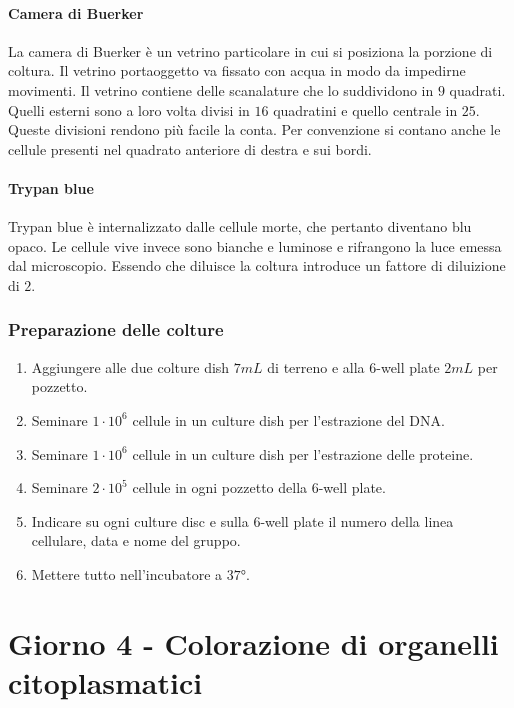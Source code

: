 			\paragraph{Camera di Buerker}
			La camera di Buerker \`e un vetrino particolare in cui si posiziona la porzione di coltura. 
			Il vetrino portaoggetto va fissato con acqua in modo da impedirne movimenti.
			Il vetrino contiene delle scanalature che lo suddividono in $9$ quadrati.
			Quelli esterni sono a loro volta divisi in $16$ quadratini e quello centrale in $25$.
			Queste divisioni rendono pi\`u facile la conta.
			Per convenzione si contano anche le cellule presenti nel quadrato anteriore di destra e sui bordi.

			\paragraph{Trypan blue}
			Trypan blue \`e internalizzato dalle cellule morte, che pertanto diventano blu opaco. 
			Le cellule vive invece sono bianche e luminose e rifrangono la luce emessa dal microscopio.
			Essendo che diluisce la coltura introduce un fattore di diluizione di $2$.
		
		\subsubsection{Preparazione delle colture}
		\begin{enumerate}
			\item Aggiungere alle due colture dish $7\si{mL}$ di terreno e alla $6$-well plate $2\si{mL}$ per pozzetto.
			\item Seminare $1\cdot 10^6$ cellule in un culture dish per l'estrazione del DNA.
			\item Seminare $1\cdot 10^6$ cellule in un culture dish per l'estrazione delle proteine.
			\item Seminare $2\cdot 10^5$ cellule in ogni pozzetto della $6$-well plate.
			\item Indicare su ogni culture disc e sulla $6$-well plate il numero della linea cellulare, data e nome del gruppo.
			\item Mettere tutto nell'incubatore a $37\si{\degree}$.
		\end{enumerate}




\section{Giorno 4 - Colorazione di organelli citoplasmatici}

